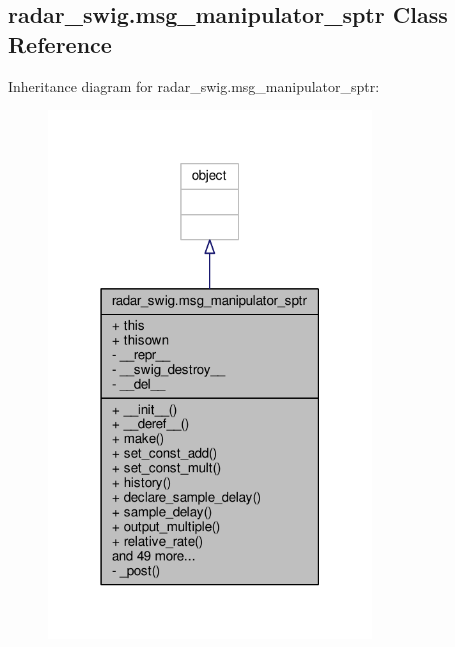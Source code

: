 \subsection{radar\+\_\+swig.\+msg\+\_\+manipulator\+\_\+sptr Class Reference}
\label{classradar__swig_1_1msg__manipulator__sptr}


Inheritance diagram for radar\+\_\+swig.\+msg\+\_\+manipulator\+\_\+sptr\+:
\nopagebreak
\begin{figure}[H]
\begin{center}
\leavevmode
\includegraphics[width=243pt]{d7/d16/classradar__swig_1_1msg__manipulator__sptr__inherit__graph}
\end{center}
\end{figure}


